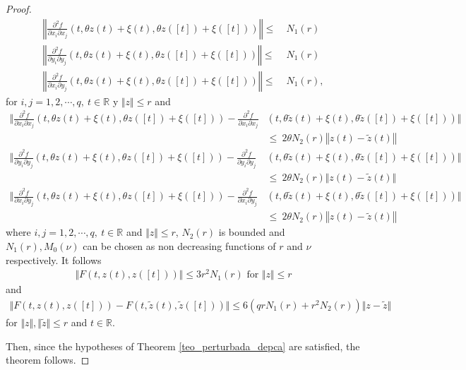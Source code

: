 \documentclass[10pt,a4paper]{amsart}
\newcommand{\bb}[1]{\mathbb{#1}}
\begin{document}
\begin{proof}
\[\begin{aligned}
\left\Vert\frac{\partial^{2}f}{\partial x_{i}\partial x_{j}}(t,\theta z(t)+\xi(t),\theta z([t])+\xi([t]))\right\Vert\leq &~{} N_{1}(r)\\
\left\Vert\frac{\partial^{2}f}{\partial y_{i}\partial y_{j}}(t,\theta z(t)+\xi(t),\theta z([t])+\xi([t]))\right\Vert\leq &~{} N_{1}(r)\\
\left\Vert\frac{\partial^{2}f}{\partial x_{i}\partial y_{j}}(t,\theta z(t)+\xi(t),\theta z([t])+\xi([t]))\right\Vert\leq &~{} N_{1}(r), 
\end{aligned}
\]
for $i,j=1,2,\cdots,q,\ t\in\bb{R}$ y $\Vert z\Vert\leq r$ and 
\[
\begin{aligned}
\bigg\Vert \frac{\partial^{2}f}{\partial x_{i}\partial x_{j}}(t,\theta z(t)+\xi(t),\theta z([t])+\xi([t])) -\frac{\partial^{2}f}{\partial x_{i}\partial x_{j}} & (t,\theta\tilde{z}(t)+\xi(t),\theta\tilde{z}([t])+\xi([t]))\bigg\Vert \\
&\leq~{}2\theta N_{2}(r)\left\Vert z(t)-\tilde{z}(t)\right\Vert
\\
\bigg\Vert \frac{\partial^{2}f}{\partial y_{i}\partial y_{j}}(t,\theta z(t)+\xi(t),\theta z([t])+\xi([t]))-\frac{\partial^{2}f}{\partial y_{i}\partial y_{j}}&(t,\theta\tilde{z}(t)+\xi(t),\theta\tilde{z}([t])+\xi([t]))\bigg\Vert \\
&\leq ~{} 2\theta N_{2}(r)\big\Vert z(t)-\tilde{z}(t)\big\Vert
\\
\bigg\Vert\frac{\partial^{2}f}{\partial x_{i}\partial y_{j}}(t,\theta z(t)+\xi(t),\theta z([t])+\xi([t]))-\frac{\partial^{2}f}{\partial x_{i}\partial y_{j}}&(t,\theta\tilde{z}(t)+\xi(t),\theta\tilde{z}([t])+\xi([t]))\bigg\Vert 
\\
&\leq~{} 2\theta N_{2}(r)\left\Vert z(t)-\tilde{z}(t)\right\Vert
\end{aligned}
\]
where $i,j=1,2,\cdots,q,\ t\in\bb{R}$ and $\Vert z\Vert\leq r$, $N_2(r)$ is bounded and $N_1(r),M_0(\nu)$ can be chosen as non decreasing functions of $r$ and $\nu$ respectively. It follows
\begin{eqnarray*}
\Vert F(t,z(t),z([t]))\Vert \leq 3r^{2}N_1(r) \mbox{ for } \Vert z\Vert\leq r
\end{eqnarray*}
and
\begin{eqnarray*}
\Vert F(t,z(t),z([t]))-F(t,\tilde{z}(t),\tilde{z}([t]))\Vert \leq 6(qrN_1(r)+r^{2}N_2(r))\Vert z-\tilde{z}\Vert
\end{eqnarray*}
for $\Vert z\Vert, \Vert\tilde{z} \Vert\leq r$ and $t\in \bb{R}$.

Then, since the hypotheses of Theorem \ref{teo_perturbada_depca} are satisfied, the theorem follows.

\end{proof}
\end{document}

